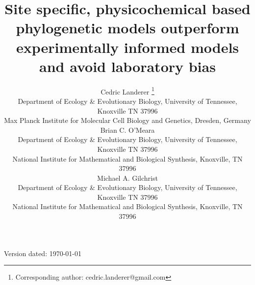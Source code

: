 \documentclass[fleqn,letterpaper]{article}
\begin{document}
\doublespacing
\linenumbers


\newcommand{\Lik}{\ensuremath{\hat{\text{Lik}}}\xspace} %
\newcommand{\GL}{\ensuremath{\text{GL}}\xspace} %
\newcommand{\selacDMS}{\emph{SelAC}+DMS\xspace}
\newcommand{\phydms}{\emph{phydms}\xspace}
\newcommand{\selac}{\emph{SelAC}\xspace}
\newcommand{\phydmsselac}{\emph{phydms+SelAC}\xspace}
\newcommand{\ecoli}{\textit{E. coli}\xspace}
\newcommand{\gy}{\emph{GY94}\xspace}
\newcommand{\hb}{\emph{HB98}\xspace}
\newcommand{\PC}{physicochemical\xspace}  
\newcommand{\DeltaAIC}{\ensuremath{\Delta\text{AIC}}\xspace}  

\makeatletter
\long{}
\makeatother

  
\title{Site specific, \PC based phylogenetic models outperform experimentally informed models and avoid laboratory bias}



\author{
  Cedric Landerer \thanks{Corresponding author: cedric.landerer@gmail.com}\\
  \small  Department of Ecology \& Evolutionary  Biology, University of Tennessee, Knoxville TN 37996\\
  \small Max Planck Institute for Molecular Cell Biology and Genetics, Dresden, Germany\\
  Brian C. O'Meara \\
  \small  Department of Ecology \& Evolutionary  Biology, University of Tennessee, Knoxville TN 37996\\
  \small National Institute for Mathematical and Biological Synthesis, Knoxville, TN 37996\\
  Michael A. Gilchrist\\
  \small  Department of Ecology \& Evolutionary  Biology, University of Tennessee, Knoxville TN 37996\\
  \small National Institute for Mathematical and Biological Synthesis, Knoxville, TN 37996\\
}



\maketitle

\vfill
\centerline{Version dated: \today}
\vfill
\newpage
\end{document}

